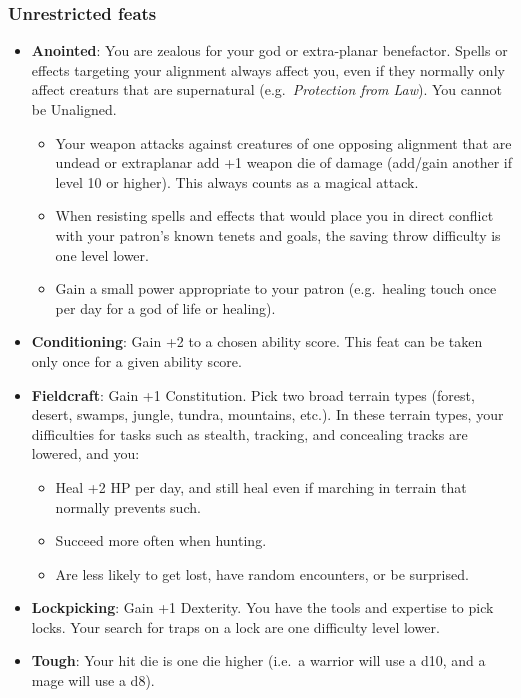 \documentclass{article}
\begin{document}
\begin{multicols}{2}
\subsubsection{Unrestricted feats}\label{unrestricted-feats}

\begin{itemize}
\tightlist
\item
  \textbf{Anointed}: You are zealous for your god or extra-planar
  benefactor. Spells or effects targeting your alignment always affect
  you, even if they normally only affect creaturs that are supernatural
  (e.g.~\emph{Protection from Law}). You cannot be Unaligned.

  \begin{itemize}
  \tightlist
  \item
    Your weapon attacks against creatures of one opposing alignment that
    are undead or extraplanar add +1 weapon die of damage (add/gain
    another if level 10 or higher). This always counts as a magical
    attack.
  \item
    When resisting spells and effects that would place you in direct
    conflict with your patron's known tenets and goals, the saving throw
    difficulty is one level lower.
  \item
    Gain a small power appropriate to your patron (e.g.~healing touch
    once per day for a god of life or healing).
  \end{itemize}
\item
  \textbf{Conditioning}: Gain +2 to a chosen ability score. This feat
  can be taken only once for a given ability score.
\item
  \textbf{Fieldcraft}: Gain +1 Constitution. Pick two broad terrain
  types (forest, desert, swamps, jungle, tundra, mountains, etc.). In
  these terrain types, your difficulties for tasks such as stealth,
  tracking, and concealing tracks are lowered, and you:

  \begin{itemize}
  \tightlist
  \item
    Heal +2 HP per day, and still heal even if marching in terrain that
    normally prevents such.
  \item
    Succeed more often when hunting.
  \item
    Are less likely to get lost, have random encounters, or be
    surprised.
  \end{itemize}
\item
  \textbf{Lockpicking}: Gain +1 Dexterity. You have the tools and
  expertise to pick locks. Your search for traps on a lock are one
  difficulty level lower.
\item
  \textbf{Tough}: Your hit die is one die higher (i.e.~a warrior will
  use a d10, and a mage will use a d8).
\end{itemize}


\end{multicols}
\end{document}
